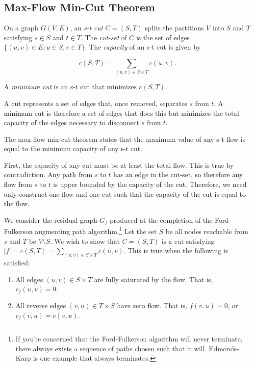 \subsection{Max-Flow Min-Cut Theorem}

On a graph $G(V,E)$, an \textit{s-t cut} $C=(S,T)$ splits the partitions $V$ into $S$ and $T$ satisfying $s \in S$ and $t \in T$. The \textit{cut-set} of $C$ is the set of edges $\{(u,v) \in E : u \in S, v \in T\}$. The \textit{capacity} of an s-t cut is given by

\[c(S,T) = \sum_{(u,v) \in S \times T}c(u,v).\]

A \textit{minimum cut} is an s-t cut that minimizes $c(S,T)$.

A cut represents a set of edges that, once removed, separates $s$ from $t$. A minimum cut is therefore a set of edges that does this but minimizes the total capacity of the edges necessary to disconnect $s$ from $t$.

The max-flow min-cut theorem states that the maximum value of any s-t flow is equal to the minimum capacity of any s-t cut.

First, the capacity of any cut must be at least the total flow. This is true by contradiction. Any path from $s$ to $t$ has an edge in the cut-set, so therefore any flow from $s$ to $t$ is upper bounded by the capacity of the cut. Therefore, we need only construct one flow and one cut such that the capacity of the cut is equal to the flow.

We consider the residual graph $G_f$ produced at the completion of the Ford-Fulkerson augmenting path algorithm.\footnote{If you're concerned that the Ford-Fulkerson algorithm will never terminate, there always exists a sequence of paths chosen such that it will. Edmonds-Karp is one example that always terminates.} Let the set $S$ be all nodes reachable from $s$ and $T$ be $V \setminus S$. We wish to show that $C=(S,T)$ is a cut satisfying $|f|=c(S,T)=\sum_{(u,v) \in S \times T} c(u,v)$. This is true when the following is satisfied:

\begin{enumerate}

\item
All edges $(u,v) \in S \times T$ are fully saturated by the flow. That is, $c_f(u,v) = 0$.

\item
All reverse edges $(v, u) \in T \times S$ have zero flow. That is, $f(v,u) = 0$, or $c_f(v,u) = c(v,u)$.

\end{enumerate}

